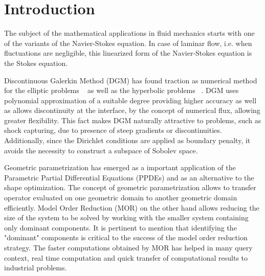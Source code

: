 \documentclass[graybox]{svmult}
\begin{document}

\section{Introduction}
\label{introduction}

The subject of the mathematical applications in fluid mechanics starts with one of the variants of the Navier-Stokes equation. In case of laminar flow, i.e. when fluctuations are negligible, this linearized form of the Navier-Stokes equation is the Stokes equation.

Discontinuous Galerkin Method (DGM) has found traction as numerical method for the elliptic problems ~\cite{peraire} as well as the hyperbolic problems ~\cite{hyperbolic}. DGM uses polynomial approximation of a suitable degree providing higher accuracy as well as allows discontinuity at the interface, by the concept of numerical flux, allowing greater flexibility. This fact makes DGM naturally attractive to problems, such as shock capturing, due to presence of steep gradients or discontinuities. Additionally, since the Dirichlet conditions are applied as boundary penalty, it avoids the necessity to construct a subspace of Sobolev space.

Geometric parametrization has emerged as a important application of the Parametric Partial Differential Equations (PPDEs) and as an alternative to the shape optimization. The concept of geometric parametrization allows to transfer operator evaluated on one geometric domain to another geometric domain efficiently. Model Order Reduction (MOR) on the other hand allows reducing the size of the system to be solved by working with the smaller system containing only dominant components. It is pertinent to mention that identifying the "dominant" components is critical to the success of the model order reduction strategy. The  faster computations obtained by MOR has helped in many query context, real time computation and quick transfer of computational results to industrial problems.
\end{document}
